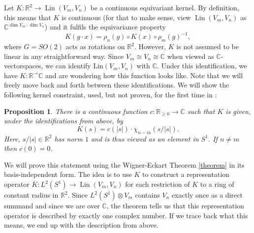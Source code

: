 \documentclass[12pt, a4paper]{article}
\theoremstyle{plain}
\newtheorem{pro}{Proposition}[section]
\theoremstyle{definition}
\theoremstyle{remark}
\newcommand{\R}{\mathds{R}}
\newcommand{\C}{\mathds{C}}
\DeclareMathOperator{\lin}{Lin}
\DeclareMathOperator{\Dim}{dim}
\begin{document}
Let $K: \R^2 \to \lin(V_m, V_n)$ be a continuous equivariant kernel. By definition, this means that $K$ is continuous (for that to make sense, view $\lin (V_m, V_n)$ as $\C^{\Dim V_m \cdot \Dim V_n}$) and it fulfils the equivariance property
\begin{equation}\label{kernel-definition}
K(g\cdot x) = \rho_n(g) \circ K(x) \circ \rho_m(g)^{-1},
\end{equation}
where $G = SO(2)$ acts as rotations on $\R^2$. However, $K$ is not assumed to be linear in any straightforward way. Since $V_m \cong V_n \cong \C$ when viewed as $\C$-vectorspaces, we can identify $\text{Lin}(V_m, V_n)$ with $\C$. Under this identification, we have $K: \R^ \to \C$ and are wondering how this function looks like. Note that we will freely move back and forth between these identifications. We will show the following kernel constraint, used, but not proven, for the first time in \cite{hnets}:

\begin{pro}\label{Wigner-Eckart}
There is a continuous function $c: \R_{\geq 0} \to \C$ such that $K$ is given, under the identifications from above, by
\begin{equation*}
K(s) = c\left(|s|\right) \cdot \chi_{n - m}\left(s/|s|\right).
\end{equation*}
Here, $s/|s| \in \R^2$ has norm $1$ and is thus viewed as an element in $S^1$. If $n \neq m$ then $c(0) = 0$.
\end{pro}

We will prove this statement using the Wigner-Eckart Theorem \ref{theorem} in its basis-independent form. The idea is to use $K$ to construct a representation operator $\overline{K}: L^2(S^1) \to \lin(V_m, V_n)$ for each restriction of $K$ to a ring of constant radius in $\R^2$. Since $L^2(S^1) \otimes V_m$ contains $V_n$ exactly once as a direct summand and since we are over $\C$, the theorem tells us that this representation operator is described by exactly one complex number. If we trace back what this means, we end up with the description from above.
\end{document}
